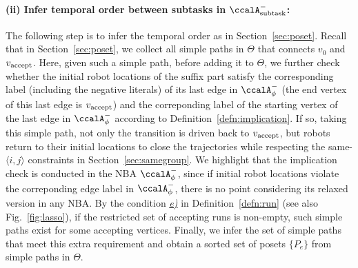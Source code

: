 \documentclass[Afour,sageh,times]{sagej}
\newcommand{\auto}[1]{\ccalA_{\textup{#1}}}
\newcommand{\autop}{\ccalA_{\phi}}
\newcommand{\vertex}[1]{v_{\textup{#1}}}
\newcommand{\ag}[2]{\langle#1,#2\rangle}
\begin{document}
{{{  \paragraph{(ii) Infer temporal order between subtasks in $\auto{subtask}^-$:}The following step is to infer the temporal order as in Section~\ref{sec:poset}. Recall that in Section~\ref{sec:poset}, we collect all simple paths in $\Theta$ that connects $v_0$ and $\vertex{accept}$. Here, given such a simple path, before adding it to $\Theta$, we further check whether the initial robot locations of the suffix part satisfy  the corresponding label (including the negative literals) of its last edge in $\autop^-$ (the end vertex of this last edge is $\vertex{accept}$) and the correponding label of the starting vertex of the last edge  in $\autop^-$ according to Definition~\ref{defn:implication}. If so, taking this simple path, not only the transition is driven back to $\vertex{accept}$, but robots return to their initial locations to close the trajectories while respecting the same-$\ag{i}{j}$ constraints in Section~\ref{sec:samegroup}. We highlight that the implication check is conducted in the NBA $\autop^-$, since if initial robot locations violate the correponding  edge label in $\autop^-$, there is no point considering its relaxed version in any NBA. By the condition \hyperref[cond:e]{\it e)} in Definition~\ref{defn:run} (see also Fig.~\ref{fig:lasso}), if the restricted set of accepting runs is non-empty, such simple paths exist for some accepting vertices. Finally, we infer the set of simple paths that meet this extra requirement and  obtain a sorted set of posets $\{P_e\}$ from simple paths in $\Theta$.

}}}
\end{document}
